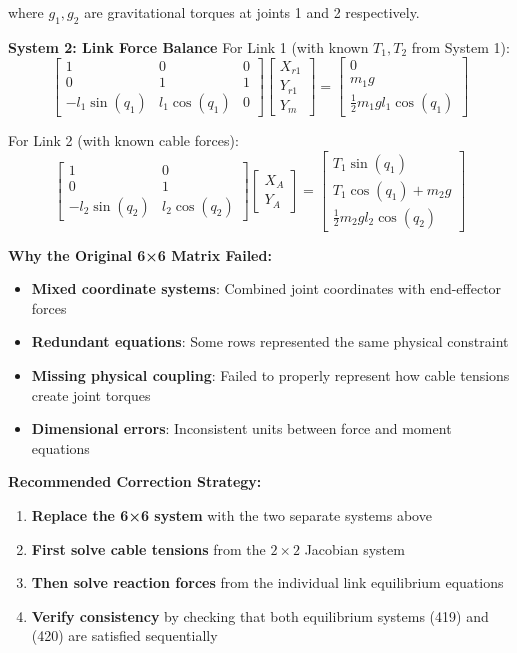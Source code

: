 where $g_1, g_2$ are gravitational torques at joints 1 and 2 respectively.

\textbf{System 2: Link Force Balance}
For Link 1 (with known $T_1, T_2$ from System 1):
$$\begin{bmatrix}
1 & 0 & 0 \\
0 & 1 & 1 \\
-l_1\sin(q_1) & l_1\cos(q_1) & 0
\end{bmatrix}
\begin{bmatrix} X_{r1} \\ Y_{r1} \\ Y_m \end{bmatrix} = 
\begin{bmatrix} 0 \\ m_1 g \\ \frac{1}{2} m_1 g l_1 \cos(q_1) \end{bmatrix}$$

For Link 2 (with known cable forces):
$$\begin{bmatrix}
1 & 0 \\
0 & 1 \\
-l_2\sin(q_2) & l_2\cos(q_2)
\end{bmatrix}
\begin{bmatrix} X_A \\ Y_A \end{bmatrix} = 
\begin{bmatrix} T_1 \sin(q_1) \\ T_1 \cos(q_1) + m_2 g \\ \frac{1}{2} m_2 g l_2 \cos(q_2) \end{bmatrix}$$

\textbf{Why the Original 6×6 Matrix Failed:}

\begin{itemize}
    \item \textbf{Mixed coordinate systems}: Combined joint coordinates with end-effector forces
    \item \textbf{Redundant equations}: Some rows represented the same physical constraint
    \item \textbf{Missing physical coupling}: Failed to properly represent how cable tensions create joint torques
    \item \textbf{Dimensional errors}: Inconsistent units between force and moment equations
\end{itemize}

\textbf{Recommended Correction Strategy:}

\begin{enumerate}
    \item \textbf{Replace the 6×6 system} with the two separate systems above
    \item \textbf{First solve cable tensions} from the $2 \times 2$ Jacobian system  
    \item \textbf{Then solve reaction forces} from the individual link equilibrium equations
    \item \textbf{Verify consistency} by checking that both equilibrium systems (419) and (420) are satisfied sequentially
\end{enumerate}

